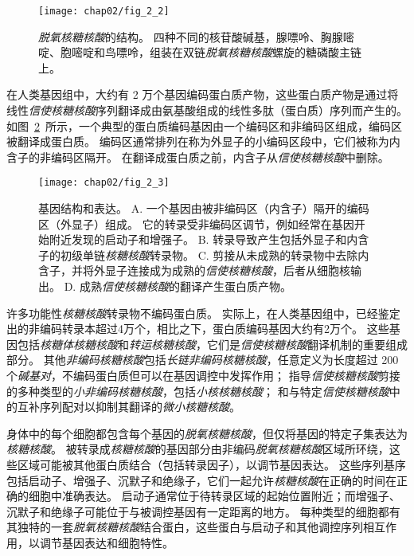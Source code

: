 \begin{figure}[htbp]
	\centering
	\texttt{[image: chap02/fig\_2\_2]}
	\caption{\textit{脱氧核糖核酸}的结构。
		四种不同的核苷酸碱基，腺嘌呤、胸腺嘧啶、胞嘧啶和鸟嘌呤，组装在双链\textit{脱氧核糖核酸}螺旋的糖磷酸主链上\cite{alberts2017molecular}。}
	\label{fig:2_2}
\end{figure}


在人类基因组中，大约有 2 万个基因编码蛋白质产物，这些蛋白质产物是通过将线性\textit{信使核糖核酸}序列翻译成由氨基酸组成的线性多肽（蛋白质）序列而产生的。
如图~\ref{fig:2_3}~所示，一个典型的蛋白质编码基因由一个编码区和非编码区组成，编码区被翻译成蛋白质。
编码区通常排列在称为外显子的小编码区段中，它们被称为内含子的非编码区隔开。
在翻译成蛋白质之前，内含子从\textit{信使核糖核酸}中删除。



\begin{figure}[htbp]
	\centering
	\texttt{[image: chap02/fig\_2\_3]}
	\caption{基因结构和表达。
		A. 一个基因由被非编码区（内含子）隔开的编码区（外显子）组成。
		它的转录受非编码区调节，例如经常在基因开始附近发现的启动子和增强子。
		B. 转录导致产生包括外显子和内含子的初级单链\textit{核糖核酸}转录物。
		C. 剪接从未成熟的转录物中去除内含子，并将外显子连接成为成熟的\textit{信使核糖核酸}，后者从细胞核输出。
		D. 成熟\textit{信使核糖核酸}的翻译产生蛋白质产物。}
	\label{fig:2_3}
\end{figure}


许多功能性\textit{核糖核酸}转录物不编码蛋白质。 
实际上，在人类基因组中，已经鉴定出的非编码转录本超过4万个，相比之下，蛋白质编码基因大约有2万个。
这些基因包括\textit{核糖体核糖核酸}和\textit{转运核糖核酸}，它们是\textit{信使核糖核酸}翻译机制的重要组成部分。
其他\textit{非编码核糖核酸}包括\textit{长链非编码核糖核酸}，任意定义为长度超过 200 个\textit{碱基对}，不编码蛋白质但可以在基因调控中发挥作用；
指导\textit{信使核糖核酸}剪接的多种类型的\textit{小非编码核糖核酸}，包括\textit{小核核糖核酸}；
和与特定\textit{信使核糖核酸}中的互补序列配对以抑制其翻译的\textit{微小核糖核酸}。



身体中的每个细胞都包含每个基因的\textit{脱氧核糖核酸}，但仅将基因的特定子集表达为\textit{核糖核酸}。
被转录成\textit{核糖核酸}的基因部分由非编码\textit{脱氧核糖核酸}区域所环绕，这些区域可能被其他蛋白质结合（包括转录因子），以调节基因表达。
这些序列基序包括启动子、增强子、沉默子和绝缘子，它们一起允许\textit{核糖核酸}在正确的时间在正确的细胞中准确表达。
启动子通常位于待转录区域的起始位置附近；而增强子、沉默子和绝缘子可能位于与被调控基因有一定距离的地方。
每种类型的细胞都有其独特的一套\textit{脱氧核糖核酸}结合蛋白，这些蛋白与启动子和其他调控序列相互作用，以调节基因表达和细胞特性。




